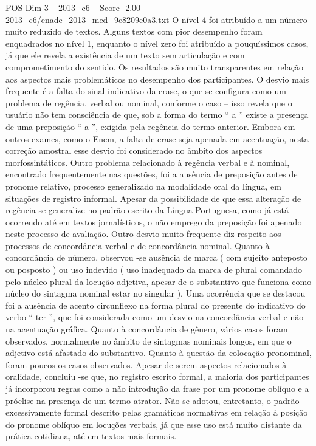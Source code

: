 \begin{textsample}{POS Dim 3 – 2013\_c6 – Score -2.00 – 2013\_c6/enade\_2013\_med\_9c8209e0a3.txt}
O nível 4 foi atribuído a um número muito reduzido de textos.
Alguns textos com pior desempenho foram enquadrados no nível 1, enquanto o nível zero foi atribuído a pouquíssimos casos, já que ele revela a existência de um texto sem articulação e com comprometimento do sentido.
Os resultados são muito transparentes em relação aos aspectos mais problemáticos no desempenho dos participantes.
O desvio mais frequente é a falta do sinal indicativo da crase, o que se configura como um problema de regência, verbal ou nominal, conforme o caso – isso revela que o usuário não tem consciência de que, sob a forma do termo “ a ” existe a presença de uma preposição “ a ”, exigida pela regência do termo anterior.
Embora em outros exames, como o Enem, a falta de crase seja apenada em acentuação, nesta correção amostral esse desvio foi considerado no âmbito dos aspectos morfossintáticos.
Outro problema relacionado à regência verbal e à nominal, encontrado frequentemente nas questões, foi a ausência de preposição antes de pronome relativo, processo generalizado na modalidade oral da língua, em situações de registro informal.
Apesar da possibilidade de que essa alteração de regência se generalize no padrão escrito da Língua Portuguesa, como já está ocorrendo até em textos jornalísticos, o não emprego da preposição foi apenado neste processo de avaliação.
Outro desvio muito frequente diz respeito aos processos de concordância verbal e de concordância nominal.
Quanto à concordância de número, observou -se ausência de marca ( com sujeito anteposto ou posposto ) ou uso indevido ( uso inadequado da marca de plural comandado pelo núcleo plural da locução adjetiva, apesar de o substantivo que funciona como núcleo do sintagma nominal estar no singular ).
Uma ocorrência que se destacou foi a ausência de acento circunflexo na forma plural do presente do indicativo do verbo “ ter ”, que foi considerada como um desvio na concordância verbal e não na acentuação gráfica.
Quanto à concordância de gênero, vários casos foram observados, normalmente no âmbito de sintagmas nominais longos, em que o adjetivo está afastado do substantivo.
Quanto à questão da colocação pronominal, foram poucos os casos observados.
Apesar de serem aspectos relacionados à oralidade, concluiu -se que, no registro escrito formal, a maioria dos participantes já incorporou regras como a não introdução da frase por um pronome oblíquo e a próclise na presença de um termo atrator.
Não se adotou, entretanto, o padrão excessivamente formal descrito pelas gramáticas normativas em relação à posição do pronome oblíquo em locuções verbais, já que esse uso está muito distante da prática cotidiana, até em textos mais formais.

\end{textsample}
